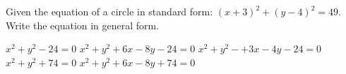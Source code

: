 \documentclass[11pt,answers]{exam}
\begin{document}
\begin{questions}
\begin{minipage}{\linewidth}
\begin{choices}
	\choice {}
	\choice {}
	\choice {}
	\CorrectChoice {}
\end{choices} \answerline
\vspace{0.5in}

\end{minipage}
\begin{minipage}{\linewidth}
\question[3] Given the equation of a circle in standard form: $(x + 3)^2 + (y - 4)^2 = 49$. Write the equation in general form.
\vspace{1ex}
\begin{choices}
	\choice $x^2+y^2-24=0$
	\CorrectChoice $x^2+y^2+6x-8y-24=0$
	\choice $x^2+y^2-+3x-4y-24=0$
	\choice $x^2+y^2+74 = 0$
	\choice $x^2+y^2+6x-8y+74=0$
\end{choices} \answerline
\vspace{0.5in}

\end{minipage}
\end{questions}
\end{document}

